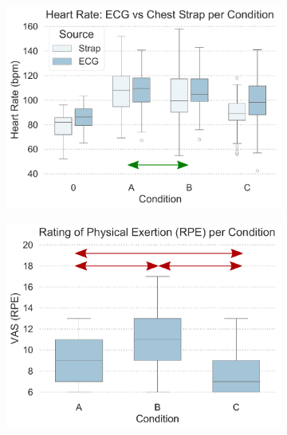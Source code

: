 \begin{figure}[htb]
	\centering
	\begin{subfigure}[t]{0.49\columnwidth}
		\centering
		\includegraphics[width=\textwidth]{include/images/hr_per_condition_by_source.pdf}
		\label{fig:physical-exertion-hr}
	\end{subfigure}
	\hspace*{\fill}
	\begin{subfigure}[t]{0.49\columnwidth}
		\centering
		\includegraphics[width=\textwidth]{include/images/rpe_per_condition.pdf}
		\label{fig:physical-exertion-rpe}
	\end{subfigure}
	\label{fig:physical-exertion}
\end{figure}